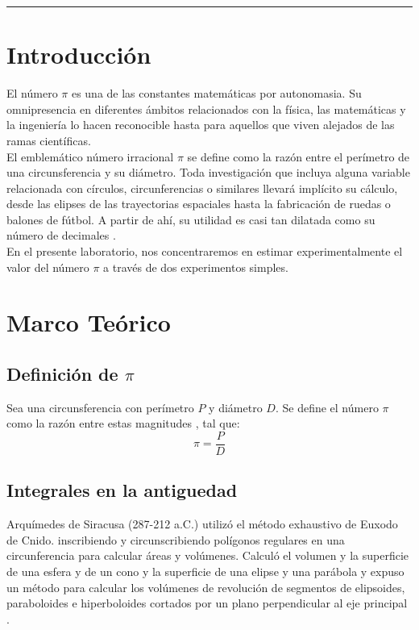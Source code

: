 \documentclass[10pt,a4paper]{article}
\begin{document}
	\begin{center}
		\textcolor{pinegreen}{\rule{150mm}{0.8mm}}
	\end{center}
	
	\begin{multicols}{2}
		\section{Introducción}
			El número $\pi$ es una de las constantes matemáticas por autonomasia. Su omnipresencia en diferentes ámbitos relacionados con la física, las matemáticas y la ingeniería lo hacen reconocible hasta para aquellos que viven alejados de las ramas científicas.\\
			
			El emblemático número irracional $\pi$ se define como la razón entre el perímetro de una circunsferencia y su diámetro. Toda investigación que incluya alguna variable relacionada con círculos, circunferencias o similares llevará implícito su cálculo, desde las elipses de las trayectorias espaciales hasta la fabricación de ruedas o balones de fútbol. A partir de ahí, su utilidad es casi tan dilatada como su número de decimales \cite{discovery}.\\
			
			En el presente laboratorio, nos concentraremos en estimar experimentalmente el valor del número $\pi$ a través de dos experimentos simples.
		\section{Marco Teórico}
		\subsection*{Definición de $\pi$}
		Sea una circunsferencia con perímetro $P$ y diámetro $D$. Se define el número $\pi$ como la razón entre estas magnitudes \cite{wikipi}, tal que:
		\begin{equation}\label{def de pi}
		\pi = \frac{P}{D}
		\end{equation}
	
		\subsection*{Integrales en la antiguedad}
		Arquímedes de Siracusa (287-212 a.C.) utilizó el método exhaustivo de Euxodo de Cnido. inscribiendo y 	
circunscribiendo polígonos regulares en una circunferencia para calcular áreas y volúmenes. Calculó el volumen y la superficie de una esfera y de un cono y la superficie de una elipse y una parábola y expuso un método para calcular los volúmenes de revolución de segmentos de elipsoides, paraboloides e hiperboloides cortados por un
plano perpendicular al eje principal \cite{integral}. \\


\end{multicols}
\end{document}
